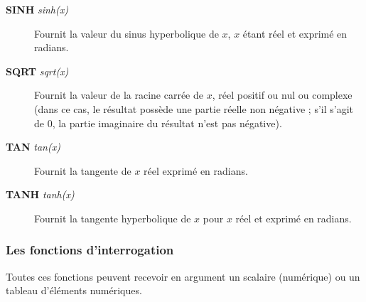 \documentclass[a4paper,twoside]{article}
\begin{document}
\begin{description}
\item[\textbf{SINH} \emph{sinh(x)}] Fournit la valeur du sinus hyperbolique de $x$, $x$ étant réel et exprimé en radians.  

\item[\textbf{SQRT} \emph{sqrt(x)}] Fournit la valeur de la racine carrée de $x$, réel positif ou nul ou complexe (dans ce cas, le résultat possède une partie réelle non négative ; s'il s'agit de 0, la partie imaginaire du résultat n'est pas négative).

\item[\textbf{TAN} \emph{tan(x)}] Fournit la tangente de $x$ réel exprimé en radians. 

\item[\textbf{TANH} \emph{tanh(x)}] Fournit la tangente hyperbolique de $x$ pour $x$  réel et exprimé en radians.
    
\end{description}

\subsubsection{Les fonctions d'interrogation}

\begin{remarque}
Toutes ces fonctions peuvent recevoir en argument un scalaire (numérique) ou un tableau d'éléments numériques.
\end{remarque}
\end{document}
